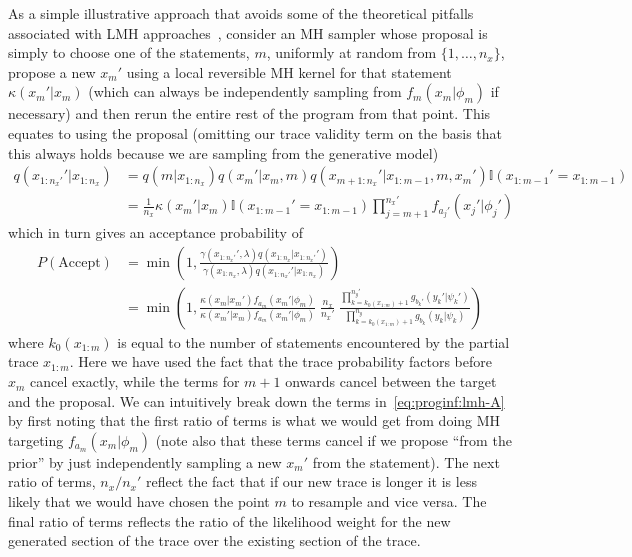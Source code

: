 As a simple illustrative approach that avoids some of the theoretical pitfalls associated
with LMH approaches~\citep{wood2014new}, consider an MH sampler whose proposal is simply to choose one
of the \sample statements, $m$, uniformly at random from $\{1,\dots,n_x\}$, propose a new $x_m'$ using a local reversible
MH kernel for that \sample statement $\kappa(x_m' | x_{m})$ (which can always be independently sampling
from $f_m(x_m|\phi_m)$ if necessary) and then rerun the entire rest of the program
from that point.  This equates to using the proposal (omitting our trace validity term on the
basis that this always holds because we are sampling from the generative model)
\begin{align}
q(x_{1:n_x'}' | x_{1:n_x}) &= q(m|x_{1:n_x}) q(x_m' | x_{m}, m) q(x_{m+1:n_x}' | x_{1:m-1}, m, x_m') \mathbb{I}(x_{1:m-1}'=x_{1:m-1}) \nonumber \\
&=\frac{1}{n_x} \kappa(x_m' | x_{m}) \mathbb{I}(x_{1:m-1}'=x_{1:m-1})  \prod_{j=m+1}^{n_x'} f_{a_{j}'} (x_{j}' | \phi_{j}')
\end{align}
which in turn gives an acceptance probability of
\begin{align}
P(\text{Accept}) &= \min\left(1, \frac{\gamma(x_{1:n_x'}',\lambda) q(x_{1:n_x} | x_{1:n_x'}') }
{\gamma(x_{1:n_x},\lambda) q(x_{1:n_x'}' | x_{1:n_x}) }\right) \nonumber\\
&= \min\left(1, \frac{\kappa(x_m | x_{m}') f_{a_m} (x_m' | \phi_m)} {\kappa(x_m' | x_{m}) f_{a_m} (x_m' | \phi_m)} \;
\frac{n_x}{n_x'} \; \frac{\prod_{k=k_0(x_{1:m})+1}^{n_y'} g_{b_{k}'} (y_{k}' | \psi_{k}')}
{\prod_{k=k_0(x_{1:m})+1}^{n_y} g_{b_{k}} (y_{k} | \psi_{k}) }\right) \label{eq:proginf:lmh-A}
\end{align}
where $k_0(x_{1:m})$ is equal to the number of \observe statements encountered by the partial
trace $x_{1:m}$.  Here we have used the fact that the trace probability factors before $x_m$ cancel
exactly, while the \sample terms for $m+1$ onwards cancel between the target and the proposal.
We can intuitively break down the terms in~\eqref{eq:proginf:lmh-A} by first noting that the first
ratio of terms is what we would get from
doing MH targeting $f_{a_m}(x_m|\phi_m)$ (note also that these terms cancel if we propose ``from the 
prior'' by just independently sampling a new $x_m'$ from the \sample statement).  The next ratio of terms,
$n_x / n_x'$ reflect the fact that if our new trace is longer it is less likely that we would have chosen the
point $m$ to resample and vice versa.  The final ratio of terms reflects the ratio of the likelihood weight
for the new generated section of the trace over the existing section of the trace.

